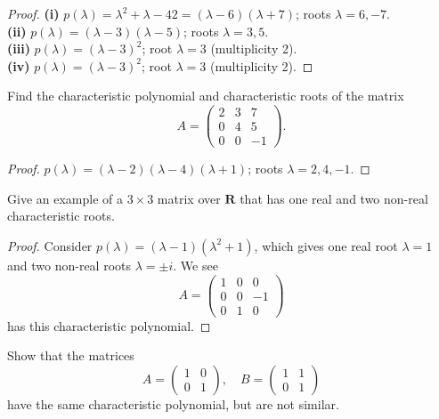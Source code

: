 \begin{proof}
\textbf{(i)} $p(\lambda)=\lambda^2+\lambda-42=(\lambda-6)(\lambda+7)$; roots $\lambda=6,-7$.\\
\textbf{(ii)} $p(\lambda)=(\lambda-3)(\lambda-5)$; roots $\lambda=3,5$.\\
\textbf{(iii)} $p(\lambda)=(\lambda-3)^2$; root $\lambda=3$ (multiplicity 2).\\
\textbf{(iv)} $p(\lambda)=(\lambda-3)^2$; root $\lambda=3$ (multiplicity 2).
\end{proof}

\begin{tcolorbox}[title=Problem 2, breakable]
Find the characteristic polynomial and characteristic roots of the matrix
\[
A = \begin{pmatrix}2 & 3 & 7\\0 & 4 & 5\\0 & 0 & -1\end{pmatrix}.
\]
\end{tcolorbox}

\begin{proof}
$p(\lambda)=(\lambda-2)(\lambda-4)(\lambda+1)$; roots $\lambda=2,4,-1$.
\end{proof}

\begin{tcolorbox}[title=Problem 4, breakable]
Give an example of a $3 \times 3$ matrix over $\mathbf{R}$ that has one real and two non-real characteristic roots.
\end{tcolorbox}

\begin{proof}
Consider $p(\lambda) = (\lambda-1)(\lambda^2+1)$, which gives one real root $\lambda=1$ and two non-real roots $\lambda=\pm i$. We see
\[
A = \begin{pmatrix}1 & 0 & 0\\0 & 0 & -1\\0 & 1 & 0\end{pmatrix}
\]
has this characteristic polynomial.
\end{proof}

\begin{tcolorbox}[title=Problem 6, breakable]
Show that the matrices
\[
A = \begin{pmatrix}1 & 0\\0 & 1\end{pmatrix}, \quad B = \begin{pmatrix}1 & 1\\0 & 1\end{pmatrix}
\]
have the same characteristic polynomial, but are not similar.
\end{tcolorbox}

